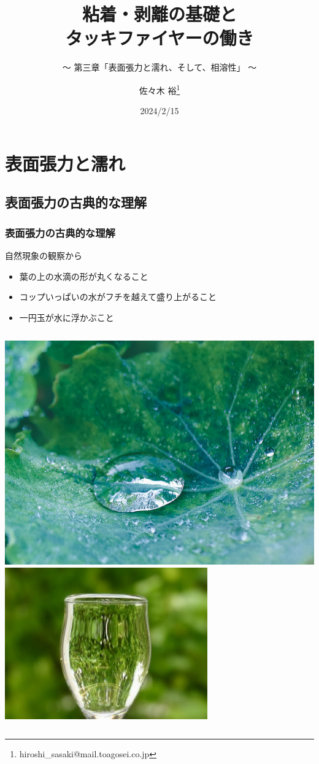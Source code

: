 \documentclass[unicode,12pt]{beamer}%
\title{粘着・剥離の基礎と\\タッキファイヤーの働き}
\subtitle{～ 第三章「表面張力と濡れ、そして、相溶性」 ～}
\author[東亞合成 佐々木]{佐々木 裕\thanks{hiroshi\_sasaki@mail.toagosei.co.jp}}
\institute[東亞合成]{東亞合成株式会社}
\date{2024/2/15}
\begin{document}
\maketitle

\begin{frame} 
    \tableofcontents[]
\end{frame} 

\section{表面張力と濡れ}

\subsection{表面張力の古典的な理解}
\begin{frame}
	\frametitle{表面張力の古典的な理解}
	\begin{block}{自然現象の観察から}
		\begin{itemize}
			\item 葉の上の水滴の形が丸くなること
			\item コップいっぱいの水がフチを越えて盛り上がること
			\item 一円玉が水に浮かぶこと
		\end{itemize}
		\begin{columns}[c, onlytextwidth]
			\centering
			\includegraphics[width=.6\textwidth]{waterdrop.png}
			\centering
			\includegraphics[width=.6\textwidth]{hyoumen_cup.jpg}

\end{columns}
\end{block}
\end{frame}
\end{document}
